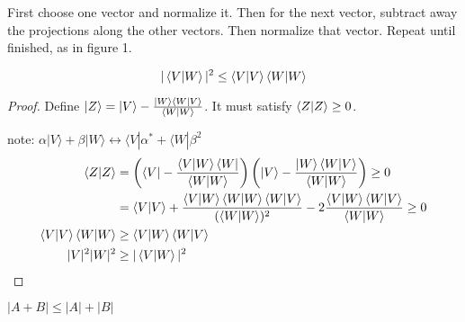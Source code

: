 \documentclass[11pt]{scrartcl}
\begin{document}
First choose one vector and normalize it. Then for the next vector, subtract away the projections along the other vectors. Then normalize that vector. Repeat until finished, as in figure 1.

\begin{theorem}
\begin{equation}
	| \braket{V|W}  | ^2 \leq \braket{ V|V} \braket{W|W} 
\end{equation}
\end{theorem}
\begin{proof}
	Define $ |Z \rangle  = |V \rangle - \frac{ |W \rangle \braket{W|V} }{ \braket{W|W} } $. It must satisfy $ \braket{Z|Z} \geq 0 $. 

	note: $ \alpha |V \rangle + \beta |W \rangle \leftrightarrow \langle V | \alpha ^* + \langle W | \beta^2 $
\begin{align}
	\braket{Z|Z} &= \left( \langle V | - \frac{ \braket{V|W} \langle W |  }{ \braket{W|W} } \right) \left( |V \rangle  - \frac{ |W \rangle \braket{W|V} }{ \braket{W|W} }\right) \geq 0 \\
		     &= \braket{V|V} + \frac{ \braket{V|W} \braket{W|W} \braket{W|V} }{ (\braket{W|W})^2 } - 2 \frac{ \braket{V|W}  \braket{W|V} }{ \braket{W|W} } \geq 0 \\
	\braket{V|V} \braket{W|W} &\geq \braket{V|W} \braket{W|V} \\
	| V | ^2 | W | ^2 &\geq | \braket{V|W}  | ^2
\end{align}

\end{proof}

\begin{corollary}
$ | A + B | \leq | A |  + | B |  $
\end{corollary}
\end{document}
